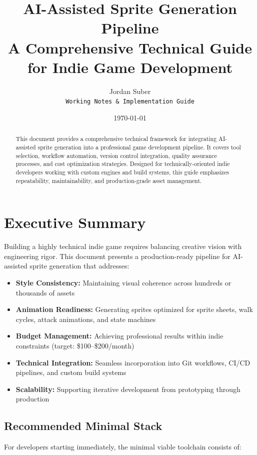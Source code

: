 \documentclass[11pt]{article}
\title{\textbf{AI-Assisted Sprite Generation Pipeline}\\
\large A Comprehensive Technical Guide for Indie Game Development}
\author{Jordan Suber\\
\texttt{Working Notes \& Implementation Guide}}
\date{\today}
\begin{document}
\maketitle

\begin{abstract}
This document provides a comprehensive technical framework for integrating AI-assisted sprite generation into a professional game development pipeline. It covers tool selection, workflow automation, version control integration, quality assurance processes, and cost optimization strategies. Designed for technically-oriented indie developers working with custom engines and build systems, this guide emphasizes repeatability, maintainability, and production-grade asset management.
\end{abstract}

\tableofcontents
\newpage

\section{Executive Summary}

Building a highly technical indie game requires balancing creative vision with engineering rigor. This document presents a production-ready pipeline for AI-assisted sprite generation that addresses:

\begin{itemize}[leftmargin=*]
    \item \textbf{Style Consistency:} Maintaining visual coherence across hundreds or thousands of assets
    \item \textbf{Animation Readiness:} Generating sprites optimized for sprite sheets, walk cycles, attack animations, and state machines
    \item \textbf{Budget Management:} Achieving professional results within indie constraints (target: \$100--\$200/month)
    \item \textbf{Technical Integration:} Seamless incorporation into Git workflows, CI/CD pipelines, and custom build systems
    \item \textbf{Scalability:} Supporting iterative development from prototyping through production
\end{itemize}

\subsection*{Recommended Minimal Stack}

For developers starting immediately, the minimal viable toolchain consists of:
\end{document}
